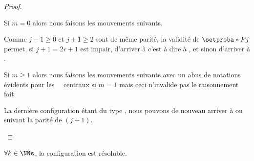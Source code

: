 \begin{proof}
\begin{itemize}[label=\small\textbullet]
        \medskip

        \noindent
        Si $m = 0$ alors nous faisons les mouvements suivants.
        \begin{mvts}
            \medskip
            \item {}

            \medskip
            \item {}

            \medskip
            \item {}
        \end{mvts}

        \noindent
        Comme $j - 1 \geq 0$ et $j + 1 \geq 2$ sont de même parité, la validité de $\setproba*{P}{j}$ permet, si $j+1 = 2r+1$ est impair, d'arriver à  c'est à dire à  , et sinon d'arriver à  .

        \medskip

        \noindent
        Si $m \geq 1$ alors nous faisons les mouvements suivants avec un abus de notations évidents pour les \,  \, centraux si $m = 1$ mais ceci n'invalide pas le raisonnement fait.
        \begin{mvts}
            \medskip
            \item {}

            \medskip
            \item {}

            \medskip
            \item {}
        \end{mvts}

        \noindent
        La dernière configuration étant du type  , nous pouvons de nouveau arriver à  ou  suivant la parité de $(j+1)$.
    \end{itemize}
\end{proof}



\begin{fact} \label{kNkB-resoluble}
    $\forall k \in \NNs$, la configuration  est résoluble.
\end{fact}


